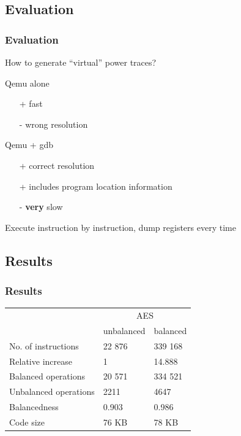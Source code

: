 \documentclass[11pt,t,usepdftitle=false,aspectratio=169]{beamer}
\begin{document}
\subsection{Evaluation}
\begin{frame}
  \frametitle{Evaluation}

  How to generate ``virtual'' power traces?
  
  \begin{alertblock}{Qemu alone}
    \begin{itemize}
    \item[+] fast
    \item[-] wrong resolution
    \end{itemize}
  \end{alertblock}

  \begin{block}{Qemu + gdb}
    \begin{itemize}
    \item[+] correct resolution
    \item[+] includes program location information
    \item[-] \textbf{very} slow
    \end{itemize}
    Execute instruction by instruction, dump registers every time
  \end{block}
\end{frame}

\subsection{Results}

\begin{frame}
  \frametitle{Results}
  \center
  \vfill
  \begin{tabular}{|l|l|l|}
    \hline
    & \multicolumn{2}{c|}{AES} \\
    \cline{2-3}
    & unbalanced & balanced \\
    \cline{2-3}
    No. of instructions & 22 876 & 339 168 \\
    Relative increase & 1 & 14.888 \\
    Balanced operations & 20 571 & 334 521 \\
    Unbalanced operations & 2211 & 4647 \\
    Balancedness      & 0.903 & 0.986 \\
    Code size         & 76 KB & 78 KB \\
    \hline
  \end{tabular}
  \vfill
\end{frame}
\end{document}
